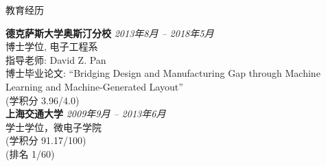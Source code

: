 

\begin{rSection}{教育经历}


{\bf 德克萨斯大学奥斯汀分校} \hfill {\em 2013年8月 -- 2018年5月} \\ 
博士学位, 电子工程系 \\
指导老师: David Z. Pan \\
博士毕业论文: ``Bridging Design and Manufacturing Gap through Machine Learning and Machine-Generated Layout'' \\
(学积分 3.96/4.0) \\

{\bf 上海交通大学} \hfill {\em 2009年9月 -- 2013年6月} \\ 
学士学位，微电子学院 \\
(学积分 91.17/100) \\
(排名 1/60)

\end{rSection}

